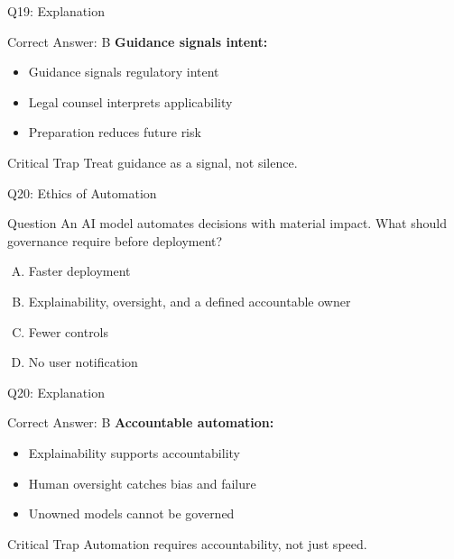 \documentclass{beamer}
\begin{document}
	\begin{frame}{Q19: Explanation}
		\begin{block}{Correct Answer: B}
			\textbf{Guidance signals intent:}
			\begin{itemize}
				\item Guidance signals regulatory intent
				\item Legal counsel interprets applicability
				\item Preparation reduces future risk
			\end{itemize}
		\end{block}
		\begin{alertblock}{Critical Trap}
			Treat guidance as a signal, not silence.
		\end{alertblock}
	\end{frame}
	
	\begin{frame}{Q20: Ethics of Automation}
		\begin{block}{Question}
			An AI model automates decisions with material impact. What should governance require before deployment?
		\end{block}
		\begin{enumerate}[(A)]
			\item Faster deployment
			\item Explainability, oversight, and a defined accountable owner
			\item Fewer controls
			\item No user notification
		\end{enumerate}
	\end{frame}
	
	\begin{frame}{Q20: Explanation}
		\begin{block}{Correct Answer: B}
			\textbf{Accountable automation:}
			\begin{itemize}
				\item Explainability supports accountability
				\item Human oversight catches bias and failure
				\item Unowned models cannot be governed
			\end{itemize}
		\end{block}
		\begin{alertblock}{Critical Trap}
			Automation requires accountability, not just speed.
		\end{alertblock}
	\end{frame}
	
\end{document}
